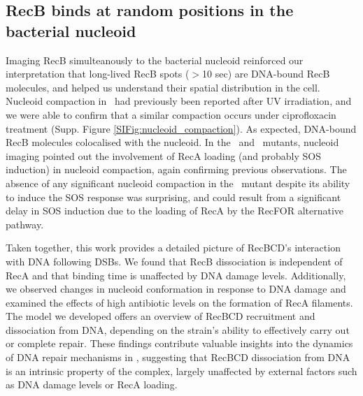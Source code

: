 \subsection*{RecB binds at random positions in the bacterial nucleoid}
Imaging RecB simulteanously to the bacterial nucleoid reinforced our interpretation that long-lived RecB spots ($>$10 sec) are DNA-bound RecB molecules, and helped us understand their spatial distribution in the cell. Nucleoid compaction in \ecoli\ had previously been reported after UV irradiation\cite{Odsbu2014}, and we were able to confirm that a similar compaction occurs under ciprofloxacin treatment (Supp. Figure \ref{SIFig:nucleoid_compaction}). As expected, DNA-bound RecB molecules colocalised with the nucleoid. In the \dreca\ and \geneteneighty\ mutants, nucleoid imaging pointed out the involvement of RecA loading (and probably SOS induction) in nucleoid compaction, again confirming previous observations\cite{Odsbu2014}. The absence of any significant nucleoid compaction in the \geneteneighty\ mutant despite its ability to induce the SOS response was surprising, and could result from a significant delay in SOS induction due to the loading of RecA by the RecFOR alternative pathway.

Taken together, this work provides a detailed picture of RecBCD's interaction with DNA following DSBs. We found that RecB dissociation is independent of RecA and that binding time is unaffected by DNA damage levels. Additionally, we observed changes in nucleoid conformation in response to DNA damage and examined the effects of high antibiotic levels on the formation of RecA filaments. The model we developed offers an overview of RecBCD recruitment and dissociation from DNA, depending on the strain's ability to effectively carry out or complete repair.
These findings contribute valuable insights into the dynamics of DNA repair mechanisms in \ecoli, suggesting that RecBCD dissociation from DNA is an intrinsic property of the complex, largely unaffected by external factors such as DNA damage levels or RecA loading.